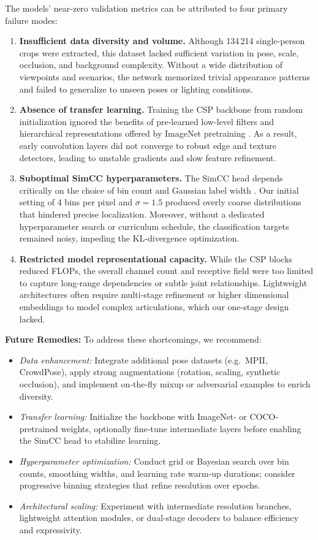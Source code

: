 The models’ near-zero validation metrics can be attributed to four primary failure modes:
\begin{enumerate}
  \item \textbf{Insufficient data diversity and volume.} Although 134\,214 single-person crops were extracted, this dataset lacked sufficient variation in pose, scale, occlusion, and background complexity. Without a wide distribution of viewpoints and scenarios, the network memorized trivial appearance patterns and failed to generalize to unseen poses or lighting conditions.
  \item \textbf{Absence of transfer learning.} Training the CSP backbone from random initialization ignored the benefits of pre‐learned low‐level filters and hierarchical representations offered by ImageNet pretraining \cite{Mathis2021Pretraining}. As a result, early convolution layers did not converge to robust edge and texture detectors, leading to unstable gradients and slow feature refinement.
  \item \textbf{Suboptimal SimCC hyperparameters.} The SimCC head depends critically on the choice of bin count and Gaussian label width \cite{Li2022SimCC}. Our initial setting of 4 bins per pixel and $\sigma=1.5$ produced overly coarse distributions that hindered precise localization. Moreover, without a dedicated hyperparameter search or curriculum schedule, the classification targets remained noisy, impeding the KL‐divergence optimization.
  \item \textbf{Restricted model representational capacity.} While the CSP blocks reduced FLOPs, the overall channel count and receptive field were too limited to capture long‐range dependencies or subtle joint relationships. Lightweight architectures often require multi‐stage refinement or higher dimensional embeddings to model complex articulations, which our one‐stage design lacked.
\end{enumerate}

\noindent\textbf{Future Remedies:} To address these shortcomings, we recommend:
\begin{itemize}
  \item \emph{Data enhancement:} Integrate additional pose datasets (e.g.\ MPII, CrowdPose), apply strong augmentations (rotation, scaling, synthetic occlusion), and implement on‐the‐fly mixup or adversarial examples to enrich diversity.
  \item \emph{Transfer learning:} Initialize the backbone with ImageNet‐ or COCO‐pretrained weights, optionally fine‐tune intermediate layers before enabling the SimCC head to stabilize learning.
  \item \emph{Hyperparameter optimization:} Conduct grid or Bayesian search over bin counts, smoothing widths, and learning rate warm‐up durations; consider progressive binning strategies that refine resolution over epochs.
  \item \emph{Architectural scaling:} Experiment with intermediate resolution branches, lightweight attention modules, or dual‐stage decoders to balance efficiency and expressivity.
\end{itemize}
